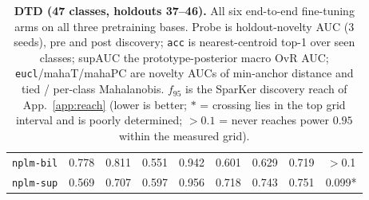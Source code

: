 \documentclass{article}
\begin{document}
\begin{table}[p]
\begin{tabular}{lcccccccc}
\texttt{nplm-bil} & 0.778 & 0.811 & 0.551 & 0.942 & 0.601 & 0.629 & 0.719 & $>$0.1 \\
\texttt{nplm-sup} & 0.569 & 0.707 & 0.597 & 0.956 & 0.718 & 0.743 & 0.751 & 0.099* \\
\bottomrule
\end{tabular}
\caption{\textbf{DTD (47 classes, holdouts 37--46).} All six end-to-end fine-tuning arms on all three
pretraining bases. Probe is holdout-novelty AUC (3 seeds), pre and post
discovery; \texttt{acc} is nearest-centroid top-1 over seen classes; supAUC the
prototype-posterior macro OvR AUC; \texttt{eucl}/mahaT/mahaPC are novelty AUCs
of min-anchor distance and tied / per-class Mahalanobis. $f_{95}$ is the
SparKer discovery reach of App.~\ref{app:reach} (lower is better;
$*$ = crossing lies in the top grid interval and is poorly determined;
$>0.1$ = never reaches power $0.95$ within the measured grid).}
\label{tab:full-dtd}
\end{table}
\end{document}

